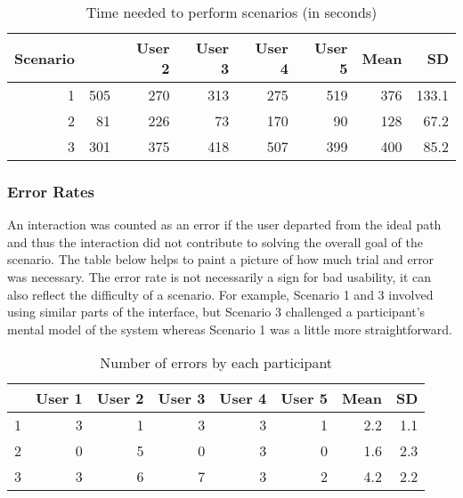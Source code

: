 \begin{table}[h!]
\begin{tabular}{|r|r|r|r|r|r|r|r|}
\hline
\rowcolor[HTML]{EFEFEF}
{\bf Scenario} & \multicolumn{1}{c|}{\cellcolor[HTML]{EFEFEF}{\bf User 1}} & {\bf User 2} & {\bf User 3} & {\bf User 4} & {\bf User 5} & {\bf Mean} & {\bf SD} \\ \hline
\cellcolor[HTML]{EFEFEF} 1 & 505 & 270 & 313 & 275 & 519 & 376 & 133.1 \\ \hline
\cellcolor[HTML]{EFEFEF} 2 & 81 & 226 & 73 & 170 & 90 & 128 & 67.2 \\ \hline
\cellcolor[HTML]{EFEFEF} 3 & 301 & 375 & 418 & 507 & 399 & 400 & 85.2      \\ \hline
\end{tabular}
\centering
\caption{Time needed to perform scenarios (in seconds)}
\label{table:time-on-tasks}
\end{table}

\subsubsection{Error Rates}
An interaction was counted as an error if the user departed from the ideal path and thus the interaction did not contribute to solving the overall goal of the scenario. The table below helps to paint a picture of how much trial and error was necessary. The error rate is not necessarily a sign for bad usability, it can also reflect the difficulty of a scenario. For example, Scenario 1 and 3 involved using similar parts of the interface, but Scenario 3 challenged a participant's mental model of the system whereas Scenario 1 was a little more straightforward.


\begin{table}[h!]
\begin{tabular}{|r|r|r|r|r|r|r|r|}
\hline
\rowcolor[HTML]{EFEFEF}
\multicolumn{1}{|l|}{\cellcolor[HTML]{EFEFEF}\textbf{Scenario}} & \multicolumn{1}{l|}{\cellcolor[HTML]{EFEFEF}\textbf{User 1}} & \multicolumn{1}{l|}{\cellcolor[HTML]{EFEFEF}\textbf{User 2}} & \multicolumn{1}{l|}{\cellcolor[HTML]{EFEFEF}\textbf{User 3}} & \multicolumn{1}{l|}{\cellcolor[HTML]{EFEFEF}\textbf{User 4}} & \multicolumn{1}{l|}{\cellcolor[HTML]{EFEFEF}\textbf{User 5}} & \multicolumn{1}{l|}{\cellcolor[HTML]{EFEFEF}\textbf{Mean}} & \multicolumn{1}{l|}{\cellcolor[HTML]{EFEFEF}\textbf{SD}} \\ \hline
\cellcolor[HTML]{EFEFEF}1 & 3 & 1 & 3 & 3 & 1 & 2.2 & 1.1 \\ \hline
\cellcolor[HTML]{EFEFEF}2 & 0 & 5 & 0 & 3 & 0 & 1.6 & 2.3 \\ \hline
\cellcolor[HTML]{EFEFEF}3 & 3 & 6 & 7 & 3 & 2 & 4.2 & 2.2 \\ \hline
\end{tabular}
\centering
\caption{Number of errors by each participant}
\label{table:error-rate}
\end{table}

